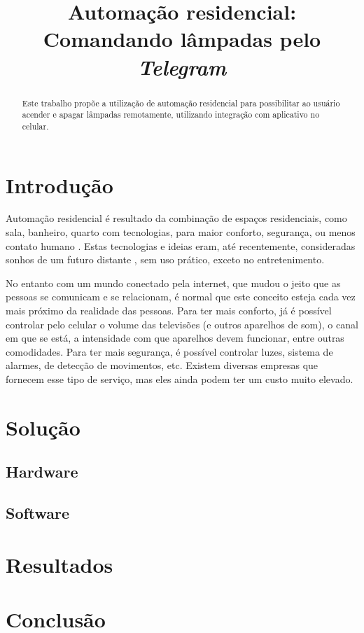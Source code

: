 \documentclass[conference]{IEEEtran}
\begin{document}
\title{Automação residencial: Comandando lâmpadas pelo \emph{Telegram}}


\author{
}

\maketitle


\begin{abstract}
Este trabalho propõe a utilização de automação residencial para possibilitar ao usuário acender e apagar lâmpadas remotamente, utilizando integração com aplicativo no celular.
\end{abstract}

\IEEEpeerreviewmaketitle

\section{Introdução}
Automação residencial é resultado da combinação de espaços residenciais, como sala, banheiro, quarto com tecnologias, para maior conforto, segurança, ou menos contato humano \cite{moraes2001using}. Estas tecnologias e ideias eram, até recentemente, consideradas sonhos de um futuro distante \cite{GHAFFARIANHOSEINI2013593}, sem uso prático, exceto no entretenimento.

No entanto com um mundo conectado pela internet, que mudou o jeito que as pessoas se comunicam e se relacionam, é normal que este conceito esteja cada vez mais próximo da realidade das pessoas. Para ter mais conforto, já é possível controlar pelo celular o volume das televisões (e outros aparelhos de som), o canal em que se está, a intensidade com que aparelhos devem funcionar, entre outras comodidades. Para ter mais segurança, é possível controlar luzes, sistema de alarmes, de detecção de movimentos, etc. Existem diversas empresas que fornecem esse tipo de serviço, mas eles ainda podem ter um custo muito elevado.

\section{Solução}
\subsection{Hardware}
\subsection{Software}
\section{Resultados}
\section{Conclusão}



\end{document}
